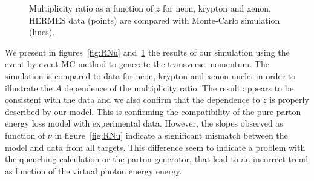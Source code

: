 \begin{figure}[tbp]
  \centering
{}
\caption {Multiplicity ratio as a function of $z$ for neon, krypton and xenon. 
HERMES data \cite{Airapetian:2011jp} (points) are compared with Monte-Carlo 
simulation (lines).}
\label{fig:Rz}
\end{figure}

We present in figures~\ref{fig:RNu} and~\ref{fig:Rz} the results of our 
simulation using the event by event MC method to generate the transverse 
momentum. The simulation is compared to data for neon, krypton and xenon nuclei 
in order to illustrate the $A$ dependence of the multiplicity ratio. The result 
appears to be consistent with the data and we also confirm that the dependence 
to $z$ is properly described by our model. This is confirming the compatibility 
of the pure parton energy loss model with experimental data. However, the 
slopes observed as function of $\nu$ in figure~\ref{fig:RNu} indicate a 
significant mismatch between the model and data from all targets. This 
difference seem to indicate a problem with the quenching calculation or the 
parton generator, that lead to an incorrect trend as function of the virtual 
photon energy energy.

